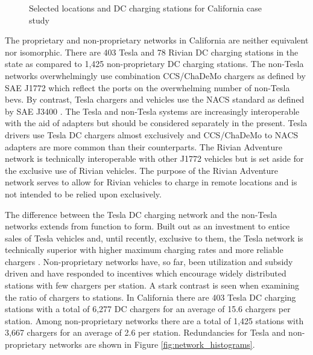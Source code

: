 \documentclass[11pt]{article}
\begin{document}
\begin{multicols}{2}
\begin{figure}[H]
	\caption{Selected locations and DC charging stations for California case study}
	\label{fig:california_atlas}
\end{figure}

The proprietary and non-proprietary networks in California are neither equivalent nor isomorphic. There are 403 Tesla and 78 Rivian DC charging stations in the state as compared to 1,425 non-proprietary DC charging stations. The non-Tesla networks overwhelmingly use combination CCS/ChaDeMo chargers as defined by SAE J1772 \cite{SAE_J1772} which reflect the ports on the overwhelming number of non-Tesla \glspl{bev}. By contrast, Tesla chargers and vehicles use the NACS standard as defined by SAE J3400 \cite{SAE_J3400}. The Tesla and non-Tesla systems are increasingly interoperable with the aid of adapters but should be considered separately in the present. Tesla drivers use Tesla DC chargers almost exclusively \cite{Visaria_2022} and CCS/ChaDeMo to NACS adapters are more common than their counterparts. The Rivian Adventure network is technically interoperable with other J1772 vehicles but is set aside for the exclusive use of Rivian vehicles. The purpose of the Rivian Adventure network serves to allow for Rivian vehicles to charge in remote locations and is not intended to be relied upon exclusively.

The difference between the Tesla DC charging network and the non-Tesla networks extends from function to form. Built out as an investment to entice sales of Tesla vehicles and, until recently, exclusive to them, the Tesla network is technically superior with higher maximum charging rates and more reliable chargers \cite{Rempel_2023, Kozumplik_2022}. Non-proprietary networks have, so far, been utilization and subsidy driven \cite{Gamage_2023} and have responded to incentives which encourage widely distributed stations with few chargers per station. A stark contrast is seen when examining the ratio of chargers to stations. In California there are 403 Tesla DC charging stations with a total of 6,277 DC chargers for an average of 15.6 chargers per station. Among non-proprietary networks there are a total of 1,425 stations with 3,667 chargers for an average of 2.6 per station. Redundancies for Tesla and non-proprietary networks are shown in Figure \ref{fig:network_histograms}. 



\end{multicols}
\end{document}

